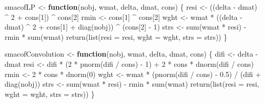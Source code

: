 \documentclass[
  12pt,
  letterpaper,
  DIV=11,
  numbers=noendperiod]{scrartcl}
\newenvironment{Shaded}{\begin{snugshade}}{\end{snugshade}}
\newcommand{\AttributeTok}[1]{\textcolor[rgb]{0.40,0.45,0.13}{#1}}
\newcommand{\ControlFlowTok}[1]{\textcolor[rgb]{0.00,0.23,0.31}{\textbf{#1}}}
\newcommand{\DecValTok}[1]{\textcolor[rgb]{0.68,0.00,0.00}{#1}}
\newcommand{\FloatTok}[1]{\textcolor[rgb]{0.68,0.00,0.00}{#1}}
\newcommand{\FunctionTok}[1]{\textcolor[rgb]{0.28,0.35,0.67}{#1}}
\newcommand{\NormalTok}[1]{\textcolor[rgb]{0.00,0.23,0.31}{#1}}
\newcommand{\OtherTok}[1]{\textcolor[rgb]{0.00,0.23,0.31}{#1}}
\newcommand{\SpecialCharTok}[1]{\textcolor[rgb]{0.37,0.37,0.37}{#1}}
\begin{document}
\begin{Shaded}
\begin{Highlighting}[]
\NormalTok{smacofLP }\OtherTok{\textless{}{-}} \ControlFlowTok{function}\NormalTok{(nobj, wmat, delta, dmat, cons) \{}
\NormalTok{  resi }\OtherTok{\textless{}{-}}\NormalTok{ ((delta }\SpecialCharTok{{-}}\NormalTok{ dmat) }\SpecialCharTok{\^{}} \DecValTok{2} \SpecialCharTok{+}\NormalTok{ cons[}\DecValTok{1}\NormalTok{]) }\SpecialCharTok{\^{}}\NormalTok{ cons[}\DecValTok{2}\NormalTok{]}
\NormalTok{  rmin }\OtherTok{\textless{}{-}}\NormalTok{ cons[}\DecValTok{1}\NormalTok{] }\SpecialCharTok{\^{}}\NormalTok{ cons[}\DecValTok{2}\NormalTok{]}
\NormalTok{  wght }\OtherTok{\textless{}{-}}\NormalTok{ wmat }\SpecialCharTok{*}\NormalTok{ ((delta }\SpecialCharTok{{-}}\NormalTok{ dmat) }\SpecialCharTok{\^{}} \DecValTok{2} \SpecialCharTok{+}\NormalTok{ cons[}\DecValTok{1}\NormalTok{] }\SpecialCharTok{+} \FunctionTok{diag}\NormalTok{(nobj)) }\SpecialCharTok{\^{}}\NormalTok{ (cons[}\DecValTok{2}\NormalTok{] }\SpecialCharTok{{-}} \DecValTok{1}\NormalTok{)}
\NormalTok{  strs }\OtherTok{\textless{}{-}} \FunctionTok{sum}\NormalTok{(wmat }\SpecialCharTok{*}\NormalTok{ resi) }\SpecialCharTok{{-}}\NormalTok{ rmin }\SpecialCharTok{*} \FunctionTok{sum}\NormalTok{(wmat)}
  \FunctionTok{return}\NormalTok{(}\FunctionTok{list}\NormalTok{(}\AttributeTok{resi =}\NormalTok{ resi, }\AttributeTok{wght =}\NormalTok{ wght, }\AttributeTok{strs =}\NormalTok{ strs))}
\NormalTok{\}}

\NormalTok{smacofConvolution }\OtherTok{\textless{}{-}} \ControlFlowTok{function}\NormalTok{(nobj, wmat, delta, dmat, cons) \{}
\NormalTok{  difi }\OtherTok{\textless{}{-}}\NormalTok{ delta }\SpecialCharTok{{-}}\NormalTok{ dmat}
\NormalTok{  resi }\OtherTok{\textless{}{-}}\NormalTok{ difi }\SpecialCharTok{*}\NormalTok{ (}\DecValTok{2} \SpecialCharTok{*} \FunctionTok{pnorm}\NormalTok{(difi }\SpecialCharTok{/}\NormalTok{ cons) }\SpecialCharTok{{-}} \DecValTok{1}\NormalTok{) }\SpecialCharTok{+} \DecValTok{2} \SpecialCharTok{*}\NormalTok{ cons }\SpecialCharTok{*} \FunctionTok{dnorm}\NormalTok{(difi }\SpecialCharTok{/}\NormalTok{ cons)}
\NormalTok{  rmin }\OtherTok{\textless{}{-}} \DecValTok{2} \SpecialCharTok{*}\NormalTok{ cons }\SpecialCharTok{*} \FunctionTok{dnorm}\NormalTok{(}\DecValTok{0}\NormalTok{)}
\NormalTok{  wght }\OtherTok{\textless{}{-}}\NormalTok{ wmat }\SpecialCharTok{*}\NormalTok{ (}\FunctionTok{pnorm}\NormalTok{(difi }\SpecialCharTok{/}\NormalTok{ cons) }\SpecialCharTok{{-}} \FloatTok{0.5}\NormalTok{) }\SpecialCharTok{/}\NormalTok{ (difi }\SpecialCharTok{+} \FunctionTok{diag}\NormalTok{(nobj))}
\NormalTok{  strs }\OtherTok{\textless{}{-}} \FunctionTok{sum}\NormalTok{(wmat }\SpecialCharTok{*}\NormalTok{ resi) }\SpecialCharTok{{-}}\NormalTok{ rmin }\SpecialCharTok{*} \FunctionTok{sum}\NormalTok{(wmat)}
  \FunctionTok{return}\NormalTok{(}\FunctionTok{list}\NormalTok{(}\AttributeTok{resi =}\NormalTok{ resi, }\AttributeTok{wght =}\NormalTok{ wght, }\AttributeTok{strs =}\NormalTok{ strs))}
\NormalTok{\}}


\end{Highlighting}
\end{Shaded}
\end{document}
